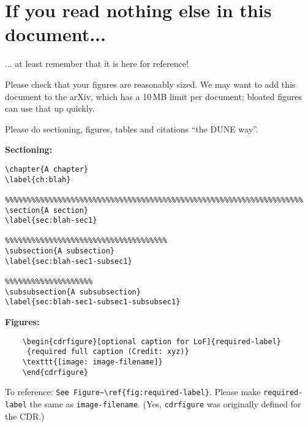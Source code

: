 \section{If you read nothing else in this document...}
\label{sec:gen-nothing}

... at least remember that it is here for reference!

Please check that your figures are reasonably sized. We may want to add this document to the arXiv, which has a 10\,MB limit per document; bloated figures can use that up quickly.

Please do sectioning, figures, tables and citations ``the DUNE way''. 

\textbf{Sectioning:}
\begin{verbatim}
\chapter{A chapter}
\label{ch:blah}

%%%%%%%%%%%%%%%%%%%%%%%%%%%%%%%%%%%%%%%%%%%%%%%%%%%%%%%%%%%%%%%%%%%%
\section{A section}
\label{sec:blah-sec1}

%%%%%%%%%%%%%%%%%%%%%%%%%%%%%%%%%%%%%
\subsection{A subsection}
\label{sec:blah-sec1-subsec1}

%%%%%%%%%%%%%%%%%%%%
\subsubsection{A subsubsection}
\label{sec:blah-sec1-subsec1-subsubsec1}
\end{verbatim}


\textbf{Figures:}
\begin{verbatim}
    \begin{cdrfigure}[optional caption for LoF]{required-label}
     {required full caption (Credit: xyz)}
    \texttt{[image: image-filename]}
    \end{cdrfigure}
\end{verbatim}

To reference: \verb|See Figure~\ref{fig:required-label}|.
Please make \verb|required-label| the same as \verb|image-filename|. (Yes, \verb|cdrfigure| was originally defined for the CDR.)

